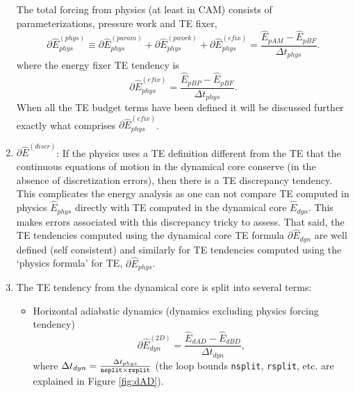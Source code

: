 \documentclass{agujournal}
\newcommand*{\gi}[1]{\widehat{#1}}
\begin{document}
\begin{enumerate}
The total forcing from physics (at least in CAM) consists of parameterizations, pressure work and TE fixer, 
\begin{equation}
\partial \gi{E}_{phys}^{({phys})}\equiv \partial \gi{E}_{phys}^{({param})}+\partial \gi{E}_{phys}^{({pwork})}+\partial \gi{E}_{phys}^{({efix})}=\frac{\gi{E}_{pAM}-\gi{E}_{pBF}}{\Delta t_{phys}}.
\end{equation}
where the energy fixer TE tendency is
\begin{equation}
\partial \gi{E}_{phys}^{({efix})}=\frac{\gi{E}_{pBP}-\gi{E}_{pBF}}{\Delta t_{phys}}.
\end{equation}
When all the TE budget terms have been defined it will be discussed further exactly what comprises $\partial \gi{E}_{phys}^{({efix})}$.
\item $\partial \gi{E}^{({discr})}$: If the physics uses a TE definition different from the TE that the continuous equations of motion in the dynamical core conserve (in the absence of discretization errors), then there is a TE discrepancy tendency. This complicates the energy analysis as one can not compare TE computed in physics $\gi{E}_{phys}$ directly with TE computed in the dynamical core $\gi{E}_{dyn}$. This makes errors associated with this discrepancy tricky to assess. That said, the TE tendencies computed using the dynamical core TE formula $\partial \gi{E}_{dyn}$ are well defined (self consistent) and similarly for TE tendencies computed using the `physics formula' for TE, $\partial \gi{E}_{phys}$.


\item The TE tendency from the dynamical core is split into several terms:
\begin{itemize} 
\item Horizontal adiabatic dynamics (dynamics excluding physics forcing tendency)
\begin{equation}
\partial \gi{E}_{dyn}^{({2D})}=\frac{\gi{E}_{dAD}-\gi{E}_{dBD}}{\Delta t_{dyn}},
\end{equation}
where $\Delta t_{dyn}=\frac{\Delta t_{phys}}{{\tt{nsplit}}\times {\tt{rsplit}}}$ (the loop bounds {\tt{nsplit}}, {\tt{rsplit}}, etc. are explained in Figure \ref{fig:dAD}).


\end{itemize}
\end{enumerate}
\end{document}
